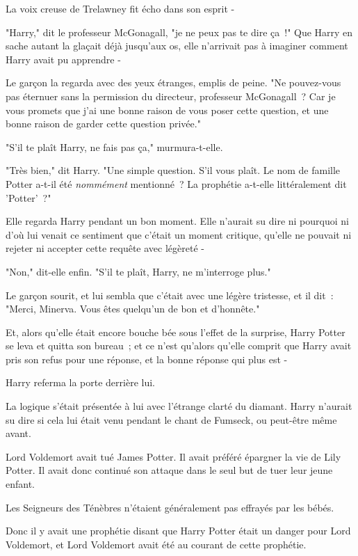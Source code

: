 La voix creuse de Trelawney fit écho dans son esprit -

"Harry," dit le professeur McGonagall, "je ne peux pas te dire ça~!" Que Harry en sache autant la glaçait déjà jusqu'aux os, elle n'arrivait pas à imaginer comment Harry avait pu apprendre -

Le garçon la regarda avec des yeux étranges, emplis de peine. "Ne pouvez-vous pas éternuer sans la permission du directeur, professeur McGonagall~? Car je vous promets que j'ai une bonne raison de vous poser cette question, et une bonne raison de garder cette question privée."

"S'il te plaît Harry, ne fais pas ça," murmura-t-elle.

"Très bien," dit Harry. "Une simple question. S'il vous plaît. Le nom de famille Potter a-t-il été \emph{nommément} mentionné~? La prophétie a-t-elle littéralement dit 'Potter'~?"

Elle regarda Harry pendant un bon moment. Elle n'aurait su dire ni pourquoi ni d'où lui venait ce sentiment que c'était un moment critique, qu'elle ne pouvait ni rejeter ni accepter cette requête avec légèreté -

"Non," dit-elle enfin. "S'il te plaît, Harry, ne m'interroge plus."

Le garçon sourit, et lui sembla que c'était avec une légère tristesse, et il dit~: "Merci, Minerva. Vous êtes quelqu'un de bon et d'honnête."

Et, alors qu'elle était encore bouche bée sous l'effet de la surprise, Harry Potter se leva et quitta son bureau~; et ce n'est qu'alors qu'elle comprit que Harry avait pris son refus pour une réponse, et la bonne réponse qui plus est -

Harry referma la porte derrière lui.

La logique s'était présentée à lui avec l'étrange clarté du diamant. Harry n'aurait su dire si cela lui était venu pendant le chant de Fumseck, ou peut-être même avant.

Lord Voldemort avait tué James Potter. Il avait préféré épargner la vie de Lily Potter. Il avait donc continué son attaque dans le seul but de tuer leur jeune enfant.

Les Seigneurs des Ténèbres n'étaient généralement pas effrayés par les bébés.

Donc il y avait une prophétie disant que Harry Potter était un danger pour Lord Voldemort, et Lord Voldemort avait été au courant de cette prophétie.

